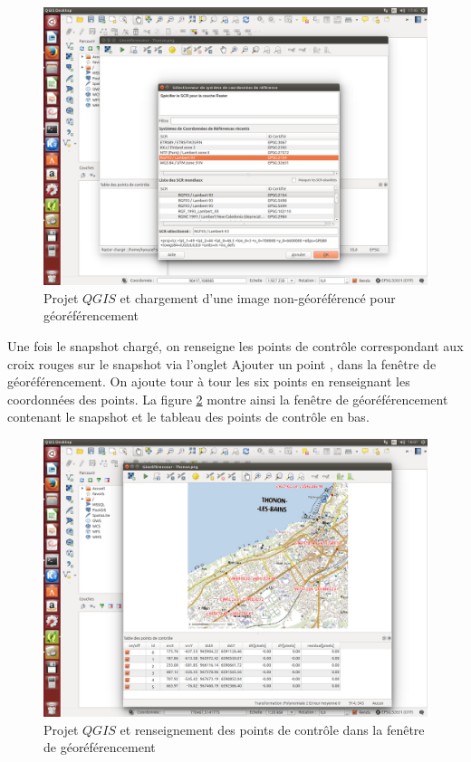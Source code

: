 \documentclass{book}
\begin{document}
\begin{figure}[H]
\begin{center}
\includegraphics[scale=0.3]{images/georeferencing/qgis-georef.png}
\end{center}
\caption{Projet $QGIS$ et chargement d'une image non-géoréférencé pour géoréférencement}
\label{qgis-georef}
\end{figure}

Une fois le snapshot chargé, on renseigne les points de contr\^{o}le correspondant aux croix rouges sur le snapshot via l'onglet 
\og Ajouter un point \fg{}, dans la fenêtre de géoréférencement. On ajoute tour à tour les six points en renseignant
les coordonnées des points. La figure \ref{qgis-points} montre ainsi la fen\^{e}tre de géoréférencement contenant le snapshot 
et le tableau des points de contr\^{o}le en bas.

\begin{figure}[H]
\begin{center}
\includegraphics[scale=0.3]{images/georeferencing/qgis-points.png}
\end{center}
\caption{Projet $QGIS$ et renseignement des points de contr\^{o}le dans la fen\^{e}tre de géoréférencement}
\label{qgis-points}
\end{figure}
\end{document}
